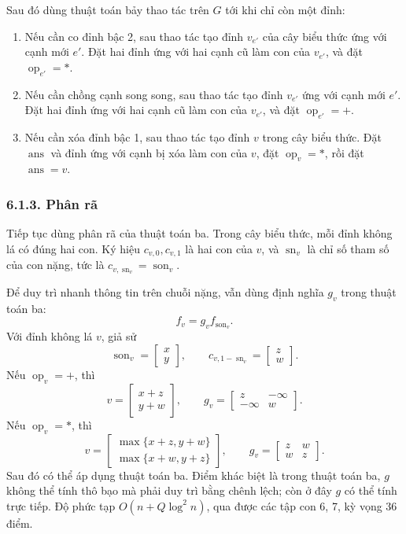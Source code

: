\documentclass[11pt]{article}
\begin{document}
Sau đó dùng thuật toán bảy thao tác trên \(G\) tới khi chỉ còn một đỉnh:
\begin{enumerate}
  \item Nếu cần co đỉnh bậc 2, sau thao tác tạo đỉnh \(v_{e'}\) của cây biểu
        thức ứng với cạnh mới \(e'\). Đặt hai đỉnh ứng với hai cạnh cũ làm con
        của \(v_{e'}\), và đặt \(\operatorname{op}_{e'}=\ast\).
  \item Nếu cần chồng cạnh song song, sau thao tác tạo đỉnh \(v_{e'}\) ứng với
        cạnh mới \(e'\). Đặt hai đỉnh ứng với hai cạnh cũ làm con của
        \(v_{e'}\), và đặt \(\operatorname{op}_{e'}=+\).
  \item Nếu cần xóa đỉnh bậc 1, sau thao tác tạo đỉnh \(v\) trong cây biểu
        thức. Đặt \(\operatorname{ans}\) và đỉnh ứng với cạnh bị xóa làm con
        của \(v\), đặt \(\operatorname{op}_v=\ast\), rồi đặt
        \(\operatorname{ans}=v\).
\end{enumerate}

\subsubsection*{6.1.3. Phân rã}

Tiếp tục dùng phân rã của thuật toán ba. Trong cây biểu thức, mỗi đỉnh không
lá có đúng hai con. Ký hiệu \(c_{v,0},c_{v,1}\) là hai con của \(v\), và
\(\operatorname{sn}_v\) là chỉ số tham số của con nặng, tức là
\(c_{v,\operatorname{sn}_v}=\operatorname{son}_v\).

Để duy trì nhanh thông tin trên chuỗi nặng, vẫn dùng định nghĩa \(g_v\) trong
thuật toán ba:
\[
  f_v=g_v f_{\operatorname{son}_v}.
\]
Với đỉnh không lá \(v\), giả sử
\[
  \operatorname{son}_v=\begin{bmatrix}x\\y\end{bmatrix},\qquad
  c_{v,1-\operatorname{sn}_v}=\begin{bmatrix}z\\w\end{bmatrix}.
\]
Nếu \(\operatorname{op}_v=+\), thì
\[
  v=\begin{bmatrix}x+z\\y+w\end{bmatrix},\qquad
  g_v=\begin{bmatrix}z&-\infty\\-\infty&w\end{bmatrix}.
\]
Nếu \(\operatorname{op}_v=\ast\), thì
\[
  v=\begin{bmatrix}\max\{x+z,y+w\}\\ \max\{x+w,y+z\}\end{bmatrix},\qquad
  g_v=\begin{bmatrix}z&w\\w&z\end{bmatrix}.
\]
Sau đó có thể áp dụng thuật toán ba. Điểm khác biệt là trong thuật toán ba,
\(g\) không thể tính thô bạo mà phải duy trì bằng chênh lệch; còn ở đây \(g\)
có thể tính trực tiếp. Độ phức tạp \(O(n+Q\log^2 n)\), qua được các tập con
6, 7, kỳ vọng 36 điểm.
\end{document}

